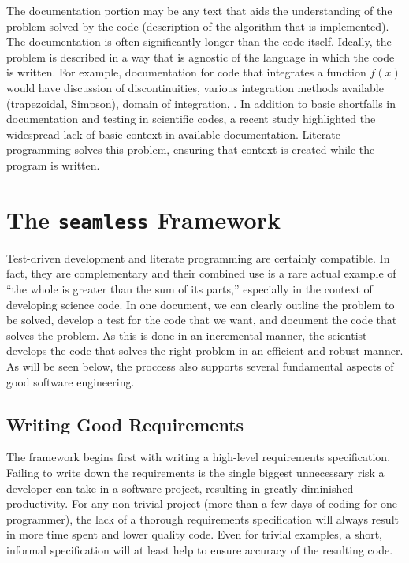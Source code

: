 The documentation portion may be any text that aids the understanding of the problem solved by the code 
(\eg description of the algorithm that is implemented).  The documentation is often significantly 
longer than the code itself. Ideally, the problem is described in a way that is agnostic of the language
in which the code is written.  For example, documentation for code that integrates a function $f(x)$ would
have discussion of discontinuities, various integration methods available (\eg trapezoidal, Simpson), 
domain of integration, \etc. 
In addition to basic shortfalls in documentation and testing in scientific codes, a recent 
study highlighted the widespread lack of basic context in available documentation.\cite{petre}
Literate programming solves this problem, ensuring that context is created while the program
is written.



\section{The \texttt{seamless} Framework}
Test-driven development and literate programming are certainly compatible.  In fact, they are 
complementary and their combined use is a rare actual example of ``the whole is greater
than the sum of its parts,'' especially in the context of developing science code.  
In one document, we can clearly outline the problem to be solved, develop a test for the 
code that we want, and document the code that solves the problem. As this is done in an incremental
manner, the scientist develops the code that solves the right problem in an efficient and robust manner.
As will be seen below, the proccess also supports several fundamental aspects of good software
engineering.

\subsection{Writing Good Requirements}\label{good-requirements}

The \seamless framework begins first with writing a high-level requirements specification.
Failing to write down the requirements is the single biggest unnecessary risk a developer
can take in a software project, resulting in greatly diminished productivity. 
For any non-trivial project (more than a few days of coding for one programmer), 
the lack of a thorough requirements specification will always result in more time spent and lower quality code.
Even for trivial examples, a short, informal specification will at least help to ensure
accuracy of the resulting code.

